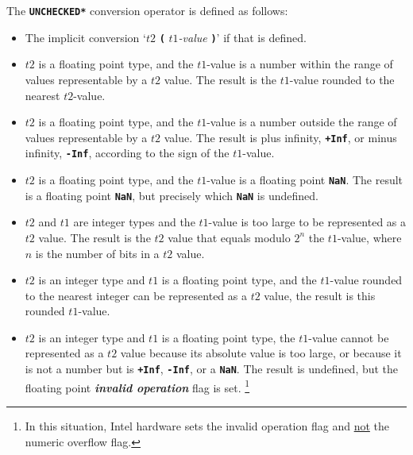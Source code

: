 \documentclass[12pt]{article}
\newcommand{\TT}[1]{{\tt \bfseries #1}}
\newcommand{\key}[1]{{\bf \em #1}\index{#1}}
\begin{document}
The \TT{*UNCHECKED*} conversion operator is defined as follows:%
\begin{itemize}
\item The implicit conversion `$t2$ \TT{(} $t1${\em -value} \TT{)}'
if that is defined.
\item $t2$ is a floating point type,
and the $t1$-value is a number within the range of values representable
by a $t2$ value.
The result is the $t1$-value rounded to the nearest $t2$-value.
\item $t2$ is a floating point type,
and the $t1$-value is a number outside the range of values representable
by a $t2$ value.
The result is plus infinity, \TT{+Inf}, or minus infinity, \TT{-Inf},
according to the sign of the $t1$-value.
\item $t2$ is a floating point type,
and the $t1$-value is a floating point \TT{NaN}.
The result is a floating point \TT{NaN}, but precisely which \TT{NaN}
is undefined.
\item $t2$ and $t1$ are integer types and the $t1$-value is too large
to be represented as a $t2$ value.
The result is the $t2$ value that
equals modulo $2^n$ the $t1$-value, where $n$ is the
number of bits in a $t2$ value.
\item $t2$ is an integer type and $t1$ is a floating point type, and
the $t1$-value rounded to the nearest integer
can be represented as a $t2$ value,
the result is this rounded $t1$-value.
\item $t2$ is an integer type and $t1$ is a floating point type,
the $t1$-value cannot be represented as a $t2$ value because its
absolute value is too large, or because it is not a number but is
\TT{+Inf}, \TT{-Inf}, or a \TT{NaN}.  The result is undefined, but
the floating point \key{invalid operation} flag is set.%
\footnote{In this situation,
Intel hardware sets the invalid operation flag and
\underline{not} the numeric overflow flag.}
\end{itemize}
\end{document}
